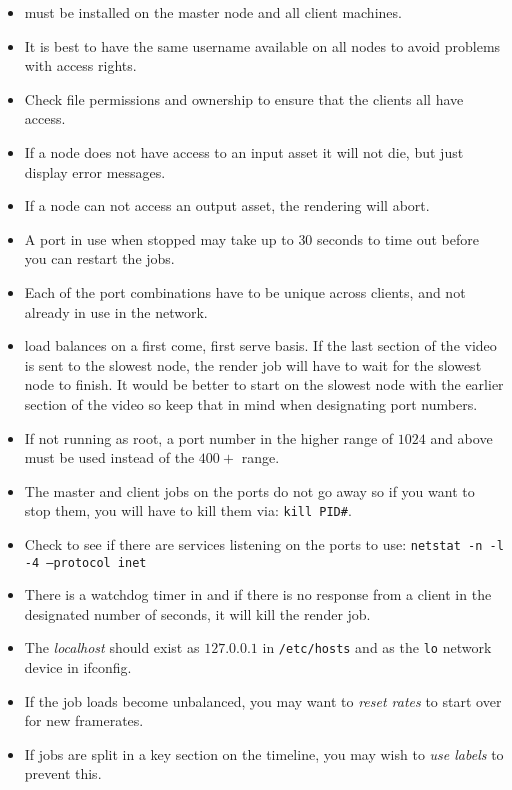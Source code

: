 \begin{itemize}
    \item \CGG{} must be installed on the master node and all client machines.
    \item It is best to have the same username available on all nodes to avoid problems with access rights.
    \item Check file permissions and ownership to ensure that the clients all have access.
    \item If a node does not have access to an input asset it will not die, but just display error messages.
    \item If a node can not access an output asset, the rendering will abort.
    \item A port in use when stopped may take up to $30$ seconds to time out before you can restart the jobs.
    \item Each of the port combinations have to be unique across clients, and not already in use in the network.
    \item \CGG{} load balances on a first come, first serve basis.  If the last section of the video is sent to the
    slowest node, the render job will have to wait for the slowest node to finish.  It would be better to 
    start on the slowest node with the earlier section of the video so keep that in mind when designating
    port numbers.
    \item If not running as root, a port number in the higher range of $1024$ and above must be used instead of
    the $400+$ range.
    \item The master and client jobs on the ports do not go away so if you want to stop them, you will have to
    kill them via: \texttt{kill PID\#}.
    \item Check to see if there are services listening on the ports to use:  \texttt{netstat -n -l -4 --protocol inet}
    \item There is a watchdog timer in \CGG{} and if there is no response from a client in the designated
    number of seconds, it will kill the render job.
    \item The \textit{localhost} should exist as $127.0.0.1$ in \texttt{/etc/hosts} and as the \texttt{lo} network device in ifconfig.
    \item If the job loads become unbalanced, you may want to \textit{reset rates} to start over for new framerates.
    \item If jobs are split in a key section on the timeline, you may wish to \textit{use labels} to prevent this.

\end{itemize}
